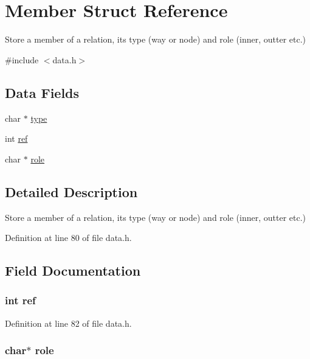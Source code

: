 \hypertarget{struct_member}{}\section{Member Struct Reference}
\label{struct_member}


Store a member of a relation, it\textquotesingle{}s type (way or node) and role (inner, outter etc.)  




{\ttfamily \#include $<$data.\+h$>$}

\subsection*{Data Fields}
\begin{DoxyCompactItemize}
\item 
char $\ast$ \hyperlink{struct_member_a23506fc4821ab6d9671f3e6222591a96}{type}
\item 
int \hyperlink{struct_member_adb528a1cb1ca190150183394d082590d}{ref}
\item 
char $\ast$ \hyperlink{struct_member_a15bcddafa57ebe7ee6d1125205c171fc}{role}
\end{DoxyCompactItemize}


\subsection{Detailed Description}
Store a member of a relation, it\textquotesingle{}s type (way or node) and role (inner, outter etc.) 

Definition at line 80 of file data.\+h.



\subsection{Field Documentation}
\subsubsection[{\texorpdfstring{ref}{ref}}]{\setlength{\rightskip}{0pt plus 5cm}int ref}\hypertarget{struct_member_adb528a1cb1ca190150183394d082590d}{}\label{struct_member_adb528a1cb1ca190150183394d082590d}


Definition at line 82 of file data.\+h.

\subsubsection[{\texorpdfstring{role}{role}}]{\setlength{\rightskip}{0pt plus 5cm}char$\ast$ role}\hypertarget{struct_member_a15bcddafa57ebe7ee6d1125205c171fc}{}\label{struct_member_a15bcddafa57ebe7ee6d1125205c171fc}


